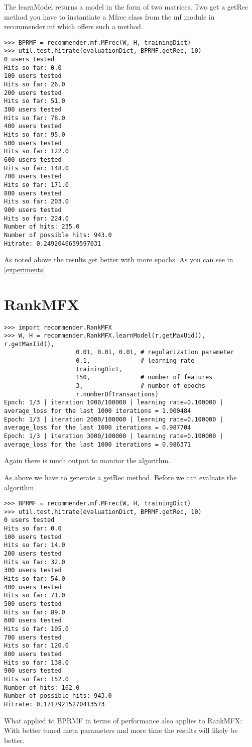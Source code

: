 The learnModel returns a model in the form of two matrices. Two get a 
getRec method you have to instantiate a Mfrec class from the mf module
in recommender.mf which offers such a method.
\begin{lstlisting}
>>> BPRMF = recommender.mf.MFrec(W, H, trainingDict)
>>> util.test.hitrate(evaluationDict, BPRMF.getRec, 10)
0 users tested
Hits so far: 0.0
100 users tested
Hits so far: 26.0
200 users tested
Hits so far: 51.0
300 users tested
Hits so far: 78.0
400 users tested
Hits so far: 95.0
500 users tested
Hits so far: 122.0
600 users tested
Hits so far: 148.0
700 users tested
Hits so far: 171.0
800 users tested
Hits so far: 203.0
900 users tested
Hits so far: 224.0
Number of hits: 235.0
Number of possible hits: 943.0
Hitrate: 0.2492046659597031
\end{lstlisting}
As noted above the results get better with more epochs. As you can see
in \ref{experiments}

\section{RankMFX}
\begin{lstlisting}
>>> import recommender.RankMFX
>>> W, H = recommender.RankMFX.learnModel(r.getMaxUid(), r.getMaxIid(),
                    0.01, 0.01, 0.01, # regularization parameter
                    0.1,              # learning rate
                    trainingDict,
                    150,              # number of features
                    3,                # number of epochs
                    r.numberOfTransactions)
Epoch: 1/3 | iteration 1000/100000 | learning rate=0.100000 | average_loss for the last 1000 iterations = 1.000484
Epoch: 1/3 | iteration 2000/100000 | learning rate=0.100000 | average_loss for the last 1000 iterations = 0.987704
Epoch: 1/3 | iteration 3000/100000 | learning rate=0.100000 | average_loss for the last 1000 iterations = 0.986371
\end{lstlisting}
Again there is much output to monitor the algorithm.

As above we have to generate a getRec method. Before we can evaluate the algorithm.
\begin{lstlisting}
>>> BPRMF = recommender.mf.MFrec(W, H, trainingDict)
>>> util.test.hitrate(evaluationDict, BPRMF.getRec, 10)
0 users tested
Hits so far: 0.0
100 users tested
Hits so far: 14.0
200 users tested
Hits so far: 32.0
300 users tested
Hits so far: 54.0
400 users tested
Hits so far: 71.0
500 users tested
Hits so far: 89.0
600 users tested
Hits so far: 105.0
700 users tested
Hits so far: 120.0
800 users tested
Hits so far: 138.0
900 users tested
Hits so far: 152.0
Number of hits: 162.0
Number of possible hits: 943.0
Hitrate: 0.17179215270413573
\end{lstlisting}
What applied to BPRMF in terms of performance also applies to RankMFX:
With better tuned meta parameters and more time the results will likely
be better.


